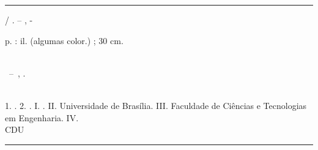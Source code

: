\begin{fichacatalografica}
	\vspace*{\fill}					%
	\hrule							%
	\begin{center}					%
	\begin{minipage}[c]{12.5cm}		%
	
	\imprimirautor
	
	\hspace{0.5cm} \imprimirtitulo  / \imprimirautor. --
	\imprimirlocal, \imprimirdata-
	
	\hspace{0.5cm} \pageref{LastPage} p. : il. (algumas color.) ; 30 cm.\\
	
	\hspace{0.5cm} \imprimirorientadorRotulo~\imprimirorientador\\
	
	\hspace{0.5cm}
	\parbox[t]{\dimexpr\linewidth-1cm\relax}{\imprimirtipotrabalho~--~\imprimirinstituicao,
	\imprimirdata.}\\
	
	\hspace{0.5cm}
		1. \imprimirpalavrachaveum.
		2. \imprimirpalavrachavedois.
		I. \imprimirorientador.
		II. Universidade de Brasília.
		III. Faculdade de Ciências e Tecnologias em Engenharia.
		IV. \imprimirtitulo\\ 			
	
	\hspace{8.75cm} CDU \nomecdu\\
	
	\end{minipage}
	\end{center}
	\hrule
\end{fichacatalografica}

